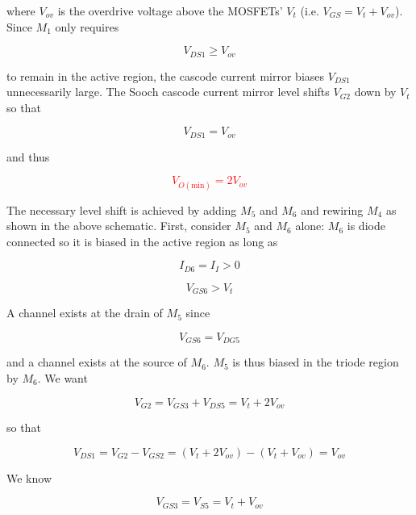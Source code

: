 where $V_{ov}$ is the overdrive voltage above the MOSFETs' $V_{t}$ (i.e. $V_{GS} = V_{t} + V_{ov}$).
Since $M_1$ only requires

\begin{equation}
V_{DS1} \geq V_{ov}
\end{equation}

to remain in the active region, the cascode current mirror biases $V_{DS1}$ unnecessarily large.
The Sooch cascode current mirror level shifts $V_{G2}$ down by $V_{t}$ so that

\begin{equation}
V_{DS1} = V_{ov}
\end{equation}

and thus

\textcolor{red}{
\begin{equation}
V_{O(\text{min})} = 2V_{ov}
\end{equation}
}

The necessary level shift is achieved by adding $M_5$ and $M_6$ and rewiring $M_4$ as shown in the above schematic.
First, consider $M_5$ and $M_6$ alone:
$M_6$ is diode connected so it is biased in the active region as long as

\begin{equation}
I_{D6} = I_{I} > 0
\end{equation}

\begin{equation}
V_{GS6} > V_{t}
\end{equation}

A channel exists at the drain of $M_5$ since

\begin{equation}
V_{GS6} = V_{DG5}
\end{equation}

and a channel exists at the source of $M_6$.
$M_5$ is thus biased in the triode region by $M_6$.
We want

\begin{equation}
V_{G2} = V_{GS3} + V_{DS5} = V_{t} + 2V_{ov}
\end{equation}

so that

\begin{equation}
V_{DS1} = V_{G2} - V_{GS2} = (V_{t} + 2V_{ov}) - (V_{t} + V_{ov}) = V_{ov}
\end{equation}

We know

\begin{equation}
V_{GS3} = V_{S5} = V_{t} + V_{ov}
\end{equation}

